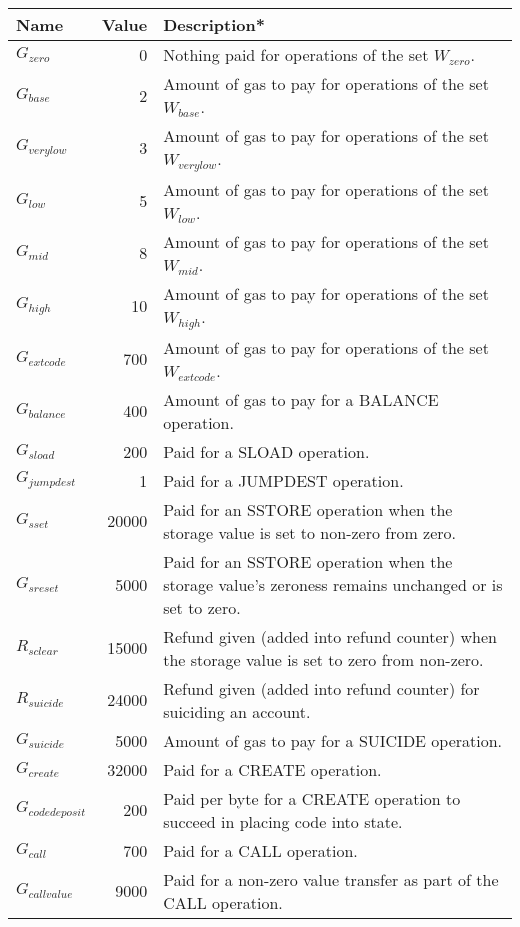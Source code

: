 \documentclass[9pt,oneside]{amsart}
\begin{document}
\begin{tabular*}{\columnwidth}[h]{lrl}
\toprule
Name & Value & Description* \\
\midrule
$G_{zero}$ & 0 & Nothing paid for operations of the set {\small $W_{zero}$}. \\
$G_{base}$ & 2 & Amount of gas to pay for operations of the set {\small $W_{base}$}. \\
$G_{verylow}$ & 3 & Amount of gas to pay for operations of the set {\small $W_{verylow}$}. \\
$G_{low}$ & 5 & Amount of gas to pay for operations of the set {\small $W_{low}$}. \\
$G_{mid}$ & 8 & Amount of gas to pay for operations of the set {\small $W_{mid}$}. \\
$G_{high}$ & 10 & Amount of gas to pay for operations of the set {\small $W_{high}$}. \\
$G_{extcode}$ & 700 & Amount of gas to pay for operations of the set {\small $W_{extcode}$}. \\
$G_{balance}$ & 400 & Amount of gas to pay for a {\small BALANCE} operation. \\
$G_{sload}$ & 200 & Paid for a {\small SLOAD} operation. \\
$G_{jumpdest}$ & 1 & Paid for a {\small JUMPDEST} operation. \\
$G_{sset}$ & 20000 & Paid for an {\small SSTORE} operation when the storage value is set to non-zero from zero. \\
$G_{sreset}$ & 5000 & Paid for an {\small SSTORE} operation when the storage value's zeroness remains unchanged or is set to zero. \\
$R_{sclear}$ & 15000 & Refund given (added into refund counter) when the storage value is set to zero from non-zero. \\
$R_{suicide}$ & 24000 & Refund given (added into refund counter) for suiciding an account. \\
$G_{suicide}$ & 5000 & Amount of gas to pay for a {\small SUICIDE} operation. \\
$G_{create}$ & 32000 & Paid for a {\small CREATE} operation. \\
$G_{codedeposit}$ & 200 & Paid per byte for a {\small CREATE} operation to succeed in placing code into state. \\
$G_{call}$ & 700 & Paid for a {\small CALL} operation. \\
$G_{callvalue}$ & 9000 & Paid for a non-zero value transfer as part of the {\small CALL} operation. \\

\end{tabular*}
\end{document}
